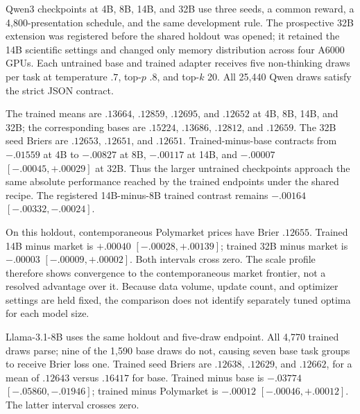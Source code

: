 Qwen3 checkpoints at 4B, 8B, 14B, and 32B use three seeds, a common reward, a
4,800-presentation schedule, and the same development rule. The prospective 32B
extension was registered before the shared holdout was opened; it retained the
14B scientific settings and changed only memory distribution across four A6000
GPUs. Each untrained base and trained adapter receives five non-thinking draws
per task at temperature $.7$, top-$p$ $.8$, and top-$k$ 20. All 25,440 Qwen
draws satisfy the strict JSON contract.

\begin{center}
\begin{minipage}{.94\linewidth}
\centering
{}
\label{tab:exp4-qwen-scale-results}
\scriptsize
\setlength{\tabcolsep}{3.5pt}
\resizebox{\linewidth}{!}{}
\end{minipage}
\end{center}

The trained means are $.13664$, $.12859$, $.12695$, and $.12652$ at 4B, 8B,
14B, and 32B; the corresponding bases are $.15224$, $.13686$, $.12812$, and
$.12659$. The 32B seed Briers are $.12653$, $.12651$, and $.12651$.
Trained-minus-base contracts from $-.01559$ at 4B to $-.00827$ at 8B,
$-.00117$ at 14B, and $-.00007$ $[-.00045,+.00029]$ at 32B. Thus the larger
untrained checkpoints approach the same absolute performance reached by the
trained endpoints under the shared recipe. The registered 14B-minus-8B trained
contrast remains $-.00164$ $[-.00332,-.00024]$.

On this holdout, contemporaneous Polymarket prices have Brier $.12655$.
Trained 14B minus market is $+.00040$ $[-.00028,+.00139]$; trained 32B minus
market is $-.00003$ $[-.00009,+.00002]$. Both intervals cross zero. The scale
profile therefore shows convergence to the contemporaneous market frontier,
not a resolved advantage over it. Because data volume, update count, and
optimizer settings are held fixed, the comparison does not identify separately
tuned optima for each model size.

Llama-3.1-8B uses the same holdout and five-draw endpoint. All 4,770 trained draws
parse; nine of the 1,590 base draws do not, causing seven base task groups to
receive Brier loss one. Trained seed Briers are $.12638$, $.12629$, and
$.12662$, for a mean of $.12643$ versus $.16417$ for base. Trained minus base is
$-.03774$ $[-.05860,-.01946]$; trained minus Polymarket is
$-.00012$ $[-.00046,+.00012]$. The latter interval crosses zero.

